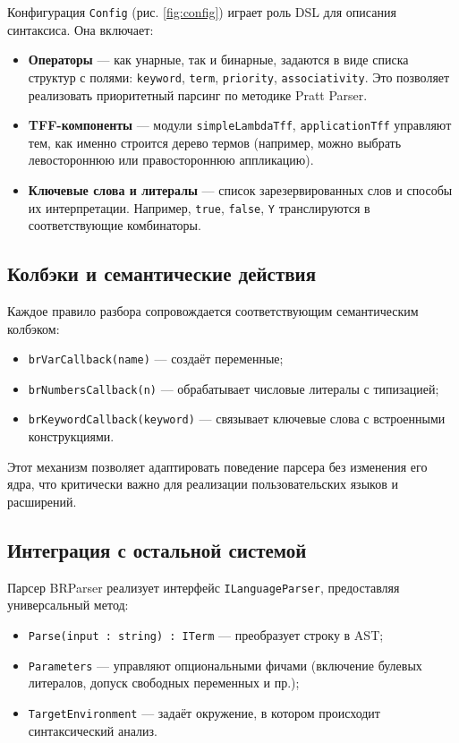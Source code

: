 Конфигурация \texttt{Config} (рис. \ref{fig:config}) играет роль DSL для описания синтаксиса. Она включает:

\begin{itemize}
  \item \textbf{Операторы} — как унарные, так и бинарные, задаются в виде списка структур с полями: \texttt{keyword}, \texttt{term}, \texttt{priority}, \texttt{associativity}. Это позволяет реализовать приоритетный парсинг по методике Pratt Parser.
  \item \textbf{TFF-компоненты} — модули \texttt{simpleLambdaTff}, \texttt{applicationTff} управляют тем, как именно строится дерево термов (например, можно выбрать левостороннюю или правостороннюю аппликацию).
  \item \textbf{Ключевые слова и литералы} — список зарезервированных слов и способы их интерпретации. Например, \texttt{true}, \texttt{false}, \texttt{Y} транслируются в соответствующие комбинаторы.
\end{itemize}

\subsection{Колбэки и семантические действия}

Каждое правило разбора сопровождается соответствующим семантическим колбэком:

\begin{itemize}
  \item \texttt{brVarCallback(name)} — создаёт переменные;
  \item \texttt{brNumbersCallback(n)} — обрабатывает числовые литералы с типизацией;
  \item \texttt{brKeywordCallback(keyword)} — связывает ключевые слова с встроенными конструкциями.
\end{itemize}

Этот механизм позволяет адаптировать поведение парсера без изменения его ядра, что критически важно для реализации пользовательских языков и расширений.

\subsection{Интеграция с остальной системой}

Парсер BRParser реализует интерфейс \texttt{ILanguageParser}, предоставляя универсальный метод:

\begin{itemize}
  \item \texttt{Parse(input : string) : ITerm} — преобразует строку в AST;
  \item \texttt{Parameters} — управляют опциональными фичами (включение булевых литералов, допуск свободных переменных и пр.);
  \item \texttt{TargetEnvironment} — задаёт окружение, в котором происходит синтаксический анализ.
\end{itemize}

